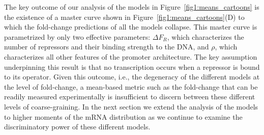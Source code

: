 The key outcome of our analysis of the models in
Figure~\ref{fig1:means_cartoons} is the existence of a master curve shown
in Figure~\ref{fig1:means_cartoons}(D) to which the fold-change predictions
of all the models collapse. This master curve is parametrized by only two
effective parameters: $\Delta F_R$, which characterizes the number of repressors
and their binding strength to the DNA, and $\rho$, which characterizes all other
features of the promoter architecture. The key assumption underpinning this
result is that no transcription occurs when a repressor is bound to its
operator. Given this outcome, i.e., the degeneracy of the different models at
the level of fold-change, a mean-based metric such as the fold-change that can
be readily measured experimentally is insufficient to discern between these
different levels of coarse-graining. In the next section we extend the analysis
of the models to higher moments of the mRNA distribution as we continue to
examine the discriminatory power of these different models.